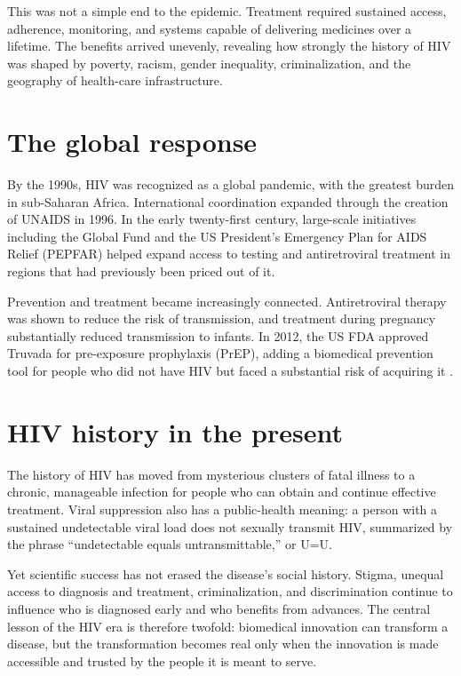 \documentclass[12pt,oneside]{book}
\begin{document}
This was not a simple end to the epidemic. Treatment required sustained access,
adherence, monitoring, and systems capable of delivering medicines over a
lifetime. The benefits arrived unevenly, revealing how strongly the history of
HIV was shaped by poverty, racism, gender inequality, criminalization, and the
geography of health-care infrastructure.

\section{The global response}
By the 1990s, HIV was recognized as a global pandemic, with the greatest burden
in sub-Saharan Africa. International coordination expanded through the creation
of UNAIDS in 1996. In the early twenty-first century, large-scale initiatives
including the Global Fund and the US President's Emergency Plan for AIDS Relief
(PEPFAR) helped expand access to testing and antiretroviral treatment in regions
that had previously been priced out of it.

Prevention and treatment became increasingly connected. Antiretroviral therapy
was shown to reduce the risk of transmission, and treatment during pregnancy
substantially reduced transmission to infants. In 2012, the US FDA approved
Truvada for pre-exposure prophylaxis (PrEP), adding a biomedical prevention tool
for people who did not have HIV but faced a substantial risk of acquiring it
\cite{nih2026}.

\section{HIV history in the present}
The history of HIV has moved from mysterious clusters of fatal illness to a
chronic, manageable infection for people who can obtain and continue effective
treatment. Viral suppression also has a public-health meaning: a person with a
sustained undetectable viral load does not sexually transmit HIV, summarized by
the phrase ``undetectable equals untransmittable,'' or U=U.

Yet scientific success has not erased the disease's social history. Stigma,
unequal access to diagnosis and treatment, criminalization, and discrimination
continue to influence who is diagnosed early and who benefits from advances.
The central lesson of the HIV era is therefore twofold: biomedical innovation
can transform a disease, but the transformation becomes real only when the
innovation is made accessible and trusted by the people it is meant to serve.
\end{document}
